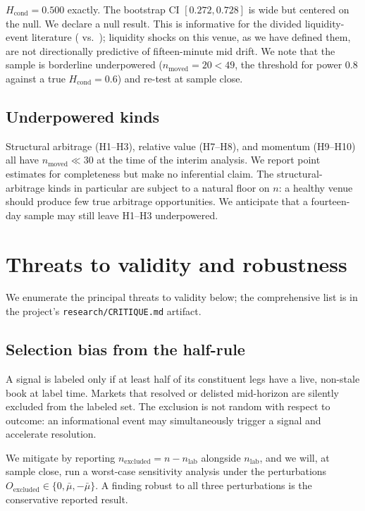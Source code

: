 \documentclass[review,12pt,authoryear]{elsarticle}
\begin{document}
\(H_\text{cond} = 0.500\) exactly. The bootstrap CI \([0.272, 0.728]\) is
wide but centered on the null. We declare a null result. This is
informative for the divided liquidity-event literature
(\citealp{EasleyLopezdePradoOHara2012} vs.\ \citealp{NaesSkjeltorp2006});
liquidity shocks on this venue, as we have defined them, are not directionally
predictive of fifteen-minute mid drift. We note that the sample is
borderline underpowered (\(n_\text{moved} = 20 < 49\), the threshold for
power 0.8 against a true \(H_\text{cond} = 0.6\)) and re-test at sample
close.

\subsection{Underpowered kinds}

Structural arbitrage (H1--H3), relative value (H7--H8), and momentum
(H9--H10) all have \(n_\text{moved} \ll 30\) at the time of the interim
analysis. We report point estimates for completeness but make no inferential
claim. The structural-arbitrage kinds in particular are subject to a
natural floor on \(n\): a healthy venue should produce few true
arbitrage opportunities. We anticipate that a fourteen-day sample may
still leave H1--H3 underpowered.

\section{Threats to validity and robustness}
\label{sec:robust}

We enumerate the principal threats to validity below; the comprehensive
list is in the project's \texttt{research/CRITIQUE.md} artifact.

\subsection{Selection bias from the half-rule}

A signal is labeled only if at least half of its constituent legs have a
live, non-stale book at label time. Markets that resolved or delisted
mid-horizon are silently excluded from the labeled set. The exclusion is
not random with respect to outcome: an informational event may simultaneously
trigger a signal and accelerate resolution.

We mitigate by reporting \(n_\text{excluded} = n - n_\text{lab}\) alongside
\(n_\text{lab}\), and we will, at sample close, run a worst-case sensitivity
analysis under the perturbations \(O_\text{excluded} \in \{0, \bar\mu, -\bar\mu\}\).
A finding robust to all three perturbations is the conservative reported
result.
\end{document}
